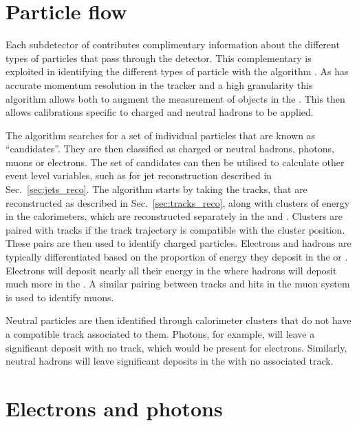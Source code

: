 \section{Particle flow}
\label{sec:pflow_reco}

Each subdetector of \CMS contributes complimentary information about
the different types of particles that pass through the detector. This
complementary is exploited in identifying the different types of
particle with the \PF algorithm
\cite{CMS-PAS-PFT-09-001,CMS-PAS-PFT-10-001,CMS-PAS-PFT-10-002}. As
\CMS has accurate momentum resolution in the tracker and a high
granularity \ECAL this algorithm allows both to augment the
measurement of objects in the \HCAL. This then allows calibrations
specific to charged and neutral hadrons to be applied. 

The \PF algorithm searches for a set of individual particles that are
known as ``\PF candidates''. They are then classified as charged or
neutral hadrons, photons, muons or electrons. The set of \PF
candidates can then be utilised to calculate other event level
variables, such as for jet reconstruction described in
Sec.~\ref{sec:jets_reco}.
The algorithm starts by taking the tracks, that are reconstructed as
described in Sec.~\ref{sec:tracks_reco}, along with clusters of energy
in the calorimeters, which are reconstructed separately in the \ECAL and
\HCAL. Clusters are paired with tracks if the track trajectory is
compatible with the cluster position. These pairs are then used to
identify charged particles. Electrons and hadrons are typically
differentiated based on the proportion of energy they deposit in the
\ECAL or \HCAL. Electrons will deposit nearly all their energy in the
\ECAL where hadrons will deposit much more in the \HCAL. A similar
pairing between tracks and hits in the muon system is used to identify
muons. 

Neutral particles are then identified through calorimeter clusters
that do not have a compatible track associated to them. Photons, for
example, will leave a significant \ECAL deposit with no track, which
would be present for electrons. Similarly, neutral hadrons will leave
significant deposits in the \HCAL with no associated track.

\section{Electrons and photons}
\label{sec:electrons_reco}


